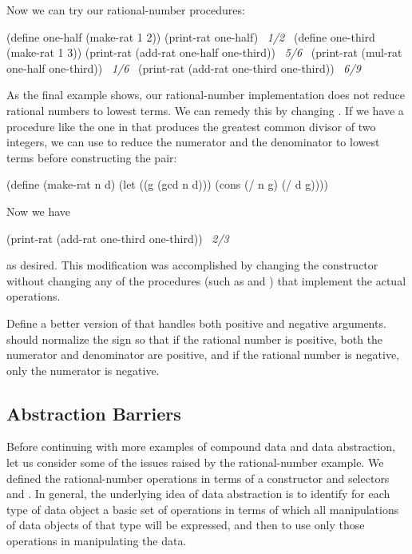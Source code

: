 \noindent
Now we can try our rational-number procedures:

\begin{codeBlock}
(define one-half (make-rat 1 2))
(print-rat one-half)
~\textit{1/2}~
(define one-third (make-rat 1 3))
(print-rat (add-rat one-half one-third))
~\textit{5/6}~
(print-rat (mul-rat one-half one-third))
~\textit{1/6}~
(print-rat (add-rat one-third one-third))
~\textit{6/9}~
\end{codeBlock}

\noindent
As the final example shows, our rational-number implementation does not reduce
rational numbers to lowest terms.  We can remedy this by changing
. If we have a  procedure like the one in
 that produces the greatest common divisor of two integers, we can
use  to reduce the numerator and the denominator to lowest terms
before constructing the pair:

\begin{codeBlock}
(define (make-rat n d)
  (let ((g (gcd n d)))
    (cons (/ n g) (/ d g))))
\end{codeBlock}

\noindent
Now we have

\begin{codeBlock}
(print-rat (add-rat one-third one-third))
~\textit{2/3}~
\end{codeBlock}

\noindent
as desired.  This modification was accomplished by changing the constructor
 without changing any of the procedures (such as 
and ) that implement the actual operations.

\begin{exerciseGroup}
\label{Exercise 2.1}
 Define a better version of
 that handles both positive and negative arguments.
 should normalize the sign so that if the rational number is
positive, both the numerator and denominator are positive, and if the rational
number is negative, only the numerator is negative.
\end{exerciseGroup}

\subsection{Abstraction Barriers}
\label{Section 2.1.2}

Before continuing with more examples of compound data and data abstraction, let
us consider some of the issues raised by the rational-number example.  We
defined the rational-number operations in terms of a constructor
 and selectors  and .  In general, the
underlying idea of data abstraction is to identify for each type of data object
a basic set of operations in terms of which all manipulations of data objects
of that type will be expressed, and then to use only those operations in
manipulating the data.

